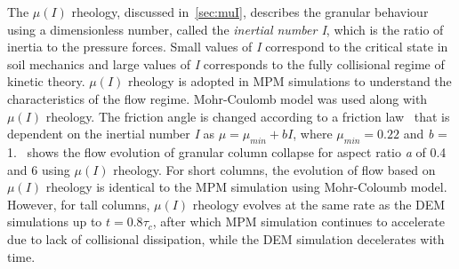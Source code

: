 The $\mu(I)$ rheology, discussed in~\cref{sec:muI}, describes the granular 
behaviour using a dimensionless number, called the \textit{inertial number I}, 
which is the ratio of inertia to the pressure forces. Small values of 
\textit{I} 
correspond to the critical state in soil mechanics and large values of 
\textit{I} 
corresponds to the fully collisional regime of kinetic theory. $\mu(I)$ 
rheology is adopted in MPM simulations to understand the characteristics of the 
flow regime. Mohr-Coulomb model was used along with $\mu(I)$ rheology. The 
friction 
angle is changed according to a friction 
law~\citep{DaCruz2005} that is dependent on the inertial number \textit{I} as 
$\mu = \mu_{min} + b 
\mathit{I}$, where $\mu_{min} = 0.22$ and \textit{b} = 1.~ 
shows the 
flow evolution of granular column collapse for aspect ratio \textit{a} of 0.4 
and 6 
using $\mu(I)$ rheology. For short columns, the evolution of flow based on 
$\mu(I)$ rheology is identical to the MPM simulation using Mohr-Coloumb model. 
However, for tall columns, $\mu(I)$ rheology evolves at the same rate as the 
DEM simulations up to $t = 0.8\tau_c$, after which MPM simulation continues to 
accelerate due to lack of collisional dissipation, while the DEM simulation 
decelerates with time. 

